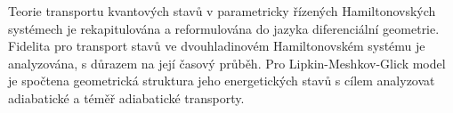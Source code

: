 \documentclass[12pt]{report}
\begin{document}


Teorie transportu kvantových stavů v parametricky řízených Hamiltonovských systémech je rekapitulována a reformulována do jazyka diferenciální geometrie. Fidelita pro transport stavů ve dvouhladinovém Hamiltonovském systému je analyzována, s důrazem na její časový průběh. Pro Lipkin-Meshkov-Glick model je spočtena geometrická struktura jeho energetických stavů s cílem analyzovat adiabatické a téměř adiabatické transporty.
\end{document}
